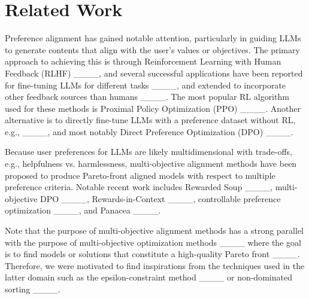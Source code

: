 \section{Related Work}
Preference alignment has gained notable attention, particularly in guiding LLMs to generate contents that align with the user's values or objectives. The primary approach to achieving this is through Reinforcement Learning with Human Feedback (RLHF) ____, and several successful applications have been reported for fine-tuning LLMs for different tasks ____, and extended to incorporate other feedback sources than humans ____. The most popular RL algorithm used for these methods is Proximal Policy Optimization (PPO) ____. Another alternative is to directly fine-tune LLMs with a preference dataset without RL, e.g., ____, and most notably Direct Preference Optimization (DPO) ____. 

Because user preferences for LLMs are likely multidimensional with trade-offs, e.g., helpfulness vs. harmlessness, multi-objective alignment methods have been proposed to produce Pareto-front aligned models with respect to multiple preference criteria. Notable recent work includes Rewarded Soup ____, multi-objective DPO ____, Rewards-in-Context ____, controllable preference optimization ____, and Panacea ____.

Note that the purpose of multi-objective alignment methods has a strong parallel with the purpose of multi-objective optimization methods ____ where the goal is to find models or solutions that constitute a high-quality Pareto front ____. Therefore, we were motivated to find inspirations from the techniques used in the latter domain such as the epsilon-constraint method ____ or non-dominated sorting ____.